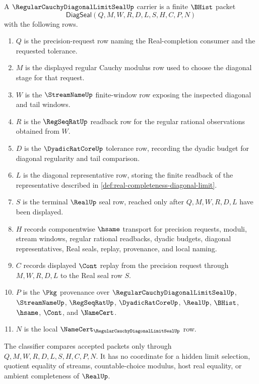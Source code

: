 \begin{definition}
\label{def:regular-cauchy-diagonal-limit-seal-carrier}
A $\RegularCauchyDiagonalLimitSealUp$ carrier is a finite $\BHist$ packet
$$
\mathsf{DiagSeal}(Q,M,W,R,D,L,S,H,C,P,N)
$$
with the following rows.
\begin{enumerate}
\item $Q$ is the precision-request row naming the Real-completion consumer and the requested tolerance.
\item $M$ is the displayed regular Cauchy modulus row used to choose the diagonal stage for that request.
\item $W$ is the $\StreamNameUp$ finite-window row exposing the inspected diagonal and tail windows.
\item $R$ is the $\RegSeqRatUp$ readback row for the regular rational observations obtained from $W$.
\item $D$ is the $\DyadicRatCoreUp$ tolerance row, recording the dyadic budget for diagonal regularity and tail comparison.
\item $L$ is the diagonal representative row, storing the finite readback of the representative described in \autoref{def:real-completeness-diagonal-limit}.
\item $S$ is the terminal $\RealUp$ seal row, reached only after $Q,M,W,R,D,L$ have been displayed.
\item $H$ records componentwise $\hsame$ transport for precision requests, moduli, stream windows, regular rational readbacks, dyadic budgets, diagonal representatives, Real seals, replay, provenance, and local naming.
\item $C$ records displayed $\Cont$ replay from the precision request through $M,W,R,D,L$ to the Real seal row $S$.
\item $P$ is the $\Pkg$ provenance over $\RegularCauchyDiagonalLimitSealUp$, $\StreamNameUp$, $\RegSeqRatUp$, $\DyadicRatCoreUp$, $\RealUp$, $\BHist$, $\hsame$, $\Cont$, and $\NameCert$.
\item $N$ is the local $\NameCert_{\RegularCauchyDiagonalLimitSealUp}$ row.
\end{enumerate}
The classifier compares accepted packets only through $Q,M,W,R,D,L,S,H,C,P,N$. It has no coordinate for a hidden limit selection, quotient equality of streams, countable-choice modulus, host real equality, or ambient completeness of $\RealUp$.
\end{definition}

